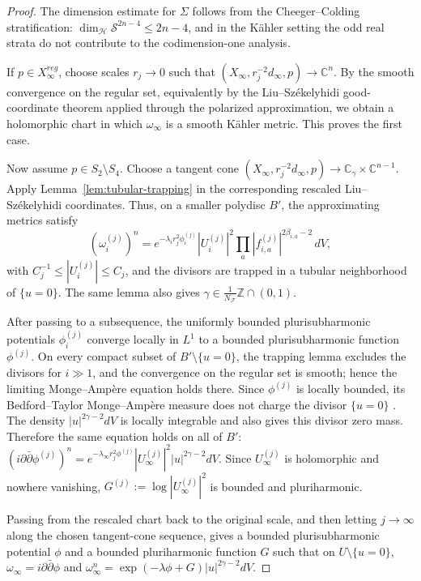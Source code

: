 \documentclass[11pt]{amsart}
\theoremstyle{definition}
\theoremstyle{remark}
\begin{document}
\begin{proof}
The dimension estimate for $\Sigma$ follows from the Cheeger--Colding
stratification: $\dim_{\mathcal H}\mathcal S^{2n-4}\leq 2n-4$, and in the
K\"ahler setting the odd real strata do not contribute to the codimension-one
analysis.

If $p\in X_\infty^{reg}$, choose scales $r_j\to0$ such that
$(X_\infty,r_j^{-2}d_\infty,p)\to \mathbb C^n$. By the smooth convergence on
the regular set, equivalently by the Liu--Sz\'ekelyhidi good-coordinate theorem
applied through the polarized approximation, we obtain a holomorphic chart in
which $\omega_\infty$ is a smooth K\"ahler metric. This proves the first case.

Now assume $p\in S_2\setminus S_4$. Choose a tangent cone
$(X_\infty,r_j^{-2}d_\infty,p)\to \mathbb C_\gamma\times\mathbb C^{n-1}$.
Apply Lemma~\ref{lem:tubular-trapping} in the corresponding rescaled Liu--Sz\'ekelyhidi
coordinates. Thus, on a smaller polydisc $B'$, the approximating metrics satisfy
\[
        (\omega_i^{(j)})^n
        =
        e^{-\lambda_i r_j^2\phi_i^{(j)}}|U_i^{(j)}|^2
        \prod_a |f_{i,a}^{(j)}|^{2\beta_{i,a}-2}\,dV ,
\]
with $C_j^{-1}\leq |U_i^{(j)}|\leq C_j$, and the divisors are trapped in a
tubular neighborhood of $\{u=0\}$. The same lemma also gives
$\gamma\in \frac1{N_{\mathcal F}}\mathbb Z\cap(0,1)$.

After passing to a subsequence, the uniformly bounded plurisubharmonic
potentials $\phi_i^{(j)}$ converge locally in $L^1$ to a bounded
plurisubharmonic function $\phi^{(j)}$. On every compact subset of
$B'\setminus\{u=0\}$, the trapping lemma excludes the divisors for $i\gg1$,
and the convergence on the regular set is smooth; hence the limiting
Monge--Amp\`ere equation holds there. Since $\phi^{(j)}$ is locally bounded,
its Bedford--Taylor Monge--Amp\`ere measure does not charge the divisor
$\{u=0\}$ \cite{BedfordTaylorCapacity}. The density
$|u|^{2\gamma-2}dV$ is locally integrable and also gives this divisor zero
mass. Therefore the same equation holds on all of $B'$:
$(i\partial\bar\partial\phi^{(j)})^n
=e^{-\lambda_\infty r_j^2\phi^{(j)}}|U_\infty^{(j)}|^2
|u|^{2\gamma-2}dV$.
Since $U_\infty^{(j)}$ is holomorphic and nowhere vanishing,
$G^{(j)}:=\log |U_\infty^{(j)}|^2$ is bounded and pluriharmonic.

Passing from the rescaled chart back to the original scale, and then letting
$j\to\infty$ along the chosen tangent-cone sequence, gives a bounded
plurisubharmonic potential $\phi$ and a bounded pluriharmonic function $G$ such
that on $U\setminus\{u=0\}$,
$\omega_\infty=i\partial\bar\partial\phi$ and
$\omega_\infty^n=\exp(-\lambda\phi+G)|u|^{2\gamma-2}dV$.


\end{proof}
\end{document}

